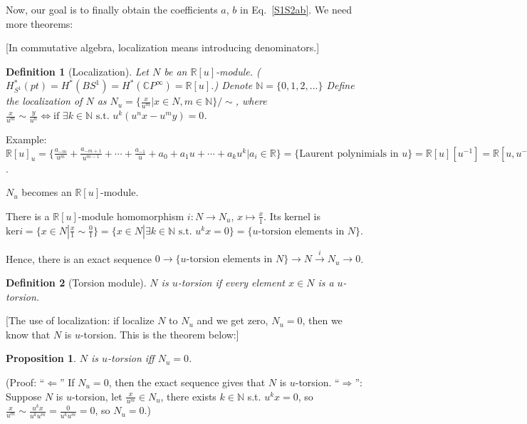 \documentclass{article}
\theoremstyle{mystyle}
\newtheorem*{definition}{Definition}%
\newtheorem*{proposition*}{Proposition}
\theoremstyle{remark}
\numberwithin{equation}{section}
\begin{document}
 
Now, our goal is to finally obtain the coefficients $a$, $b$ in Eq.~\eqref{S1S2ab}. We need more theorems:


[In commutative algebra, localization means introducing denominators.]

\begin{definition}[Localization] Let $N$ be an $\mathbb{R}[u]$-module. ($H^*_{S^1}(pt) = H^*(BS^1) = H^*(\mathbb{C}P^\infty) = \mathbb{R}[u]$.)
Denote $\mathbb{N} = \{0,1,2,...\}$
 Define the \emph{localization} of $N$ as $N_u = \{\frac{x}{u^m}|x\in N,m\in \mathbb{N}\}/\sim$, where $\frac{x}{u^m}\sim \frac{y}{u^n} \Leftrightarrow \text{if }\exists k\in \mathbb{N} \text{ s.t. } u^k(u^nx - u^m y)=0$. 
\end{definition}

Example: $\mathbb{R}[u]_u = \{\frac{a_{-m}}{u^m} + \frac{a_{-m+1}}{u^{m-1}} + \cdots + \frac{a_{-1}}{u} + a_0 + a_1u+\cdots + a_k u^k|a_i \in \mathbb{R}\} = \{\text{Laurent polynimials in }u\} = \mathbb{R}[u][u^{-1}] = \mathbb{R}[u,u^{-1}]$. 

$N_u$ becomes an $\mathbb{R}[u]$-module.

There is a $\mathbb{R}[u]$-module homomorphism $i\colon N\rightarrow N_u$, $x\mapsto \frac{x}{1}$.  Its kernel is $\mathrm{ker}i = \{x \in N| \frac{x}{1} \sim \frac{0}{1}\}=\{x \in N| \exists k \in \mathbb{N} \text{ s.t. }u^k x = 0\} = \{u\text{-torsion elements in }N\}$.

Hence, there is an exact sequence
$0\rightarrow   \{u\text{-torsion elements in }N\} \rightarrow N\xrightarrow{i}N_u\rightarrow 0$. 


\begin{definition}[Torsion module] $N$ is $u$-torsion if every element $x\in N$ is a $u$-torsion.
\end{definition}

[The use of localization: if localize $N$ to $N_u$ and we get zero, $N_u=0$, then we know that $N$ is $u$-torsion. This is the theorem below:]


\begin{proposition*} 
$N$ is $u$-torsion iff $N_u=0$. 
\end{proposition*}

(Proof: ``$\Leftarrow$'' If $N_u=0$, then the exact sequence gives that $N$ is $u$-torsion. ``$\Rightarrow$'': Suppose $N$ is $u$-torsion, let $\frac{x}{u^m}\in N_u$, there exists $k\in \mathbb{N}$ s.t. $u^kx=0$, so $\frac{x}{u^m}\sim \frac{u^kx}{u^ku^m} = \frac{0}{u^ku^m}=0$, so $N_u =0$.)
\end{document}
